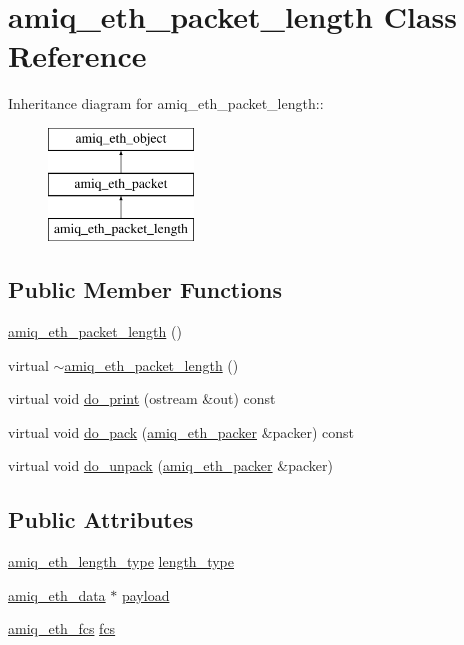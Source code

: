 \hypertarget{classamiq__eth__packet__length}{
\section{amiq\_\-eth\_\-packet\_\-length Class Reference}
\label{classamiq__eth__packet__length}
}
Inheritance diagram for amiq\_\-eth\_\-packet\_\-length::\begin{figure}[H]
\begin{center}
\leavevmode
\includegraphics[height=3cm]{classamiq__eth__packet__length}
\end{center}
\end{figure}
\subsection*{Public Member Functions}
\begin{DoxyCompactItemize}
\item 
\hyperlink{classamiq__eth__packet__length_a7967fef155cea572ef45f46baaa2e9a4}{amiq\_\-eth\_\-packet\_\-length} ()
\item 
virtual \hyperlink{classamiq__eth__packet__length_aa58226b9a57fb5a13ed5914686d2e5c1}{$\sim$amiq\_\-eth\_\-packet\_\-length} ()
\item 
virtual void \hyperlink{classamiq__eth__packet__length_a2caccb08da11dbb3ab39178bc41bca75}{do\_\-print} (ostream \&out) const 
\item 
virtual void \hyperlink{classamiq__eth__packet__length_a0e4e4b570a84eda1274ff8f0e76b45df}{do\_\-pack} (\hyperlink{classamiq__eth__packer}{amiq\_\-eth\_\-packer} \&packer) const 
\item 
virtual void \hyperlink{classamiq__eth__packet__length_ab496b25828caaf23edd5fa6d4729c578}{do\_\-unpack} (\hyperlink{classamiq__eth__packer}{amiq\_\-eth\_\-packer} \&packer)
\end{DoxyCompactItemize}
\subsection*{Public Attributes}
\begin{DoxyCompactItemize}
\item 
\hyperlink{amiq__eth__types_8cpp_a4d2be172e6524c991fe389337947afc0}{amiq\_\-eth\_\-length\_\-type} \hyperlink{classamiq__eth__packet__length_aed41233fe35015c65e02b57a496e2072}{length\_\-type}
\item 
\hyperlink{amiq__eth__types_8cpp_a3595a0a508d433d383d3e5521fc0b723}{amiq\_\-eth\_\-data} $\ast$ \hyperlink{classamiq__eth__packet__length_a66584df88e48a4d67f104806d762636a}{payload}
\item 
\hyperlink{amiq__eth__types_8cpp_adb511dc715b55539c6abdad1de981a9f}{amiq\_\-eth\_\-fcs} \hyperlink{classamiq__eth__packet__length_a955aef311a4f2fb0e7d9f10aa756e68a}{fcs}
\end{DoxyCompactItemize}


